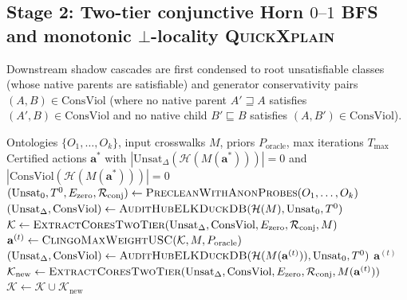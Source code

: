 \documentclass[10pt]{article}
\theoremstyle{accentdef}
\begin{document}
\subsection*{Stage 2: Two-tier conjunctive Horn $0\text{--}1$ BFS and monotonic $\bot$-locality \textsc{QuickXplain}}

Downstream shadow cascades are first condensed to root unsatisfiable classes (whose native parents are satisfiable) and generator conservativity pairs $(A, B) \in \mathrm{ConsViol}$ (where no native parent $A' \sqsupseteq A$ satisfies $(A', B) \in \mathrm{ConsViol}$ and no native child $B' \sqsubseteq B$ satisfies $(A, B') \in \mathrm{ConsViol}$).

\begin{algorithm}[t]
\caption{Two-Tier Exact Conflict Core Extraction and Max-Weight Lattice CEGAR}
\label{alg:cegar}
\footnotesize
\begin{algorithmic}[1]
\Require Ontologies $\{O_1,\dots,O_k\}$, input crosswalks $M$, priors $P_{\mathrm{oracle}}$, max iterations $T_{\max}$
\Ensure Certified actions $\mathbf{a}^*$ with $|\mathrm{Unsat}_{\Delta}(\mathcal{H}(M(\mathbf{a}^*)))| = 0$ and $|\mathrm{ConsViol}(\mathcal{H}(M(\mathbf{a}^*)))| = 0$
\State $(\mathrm{Unsat}_0, T^0, E_{\mathrm{zero}}, \mathcal{R}_{\mathrm{conj}}) \gets \textsc{PrecleanWithAnonProbes}(O_1,\dots,O_k)$ 
\State $(\mathrm{Unsat}_{\Delta}, \mathrm{ConsViol}) \gets \textsc{AuditHubELKDuckDB}(\mathcal{H}(M), \mathrm{Unsat}_0, T^0)$
\State $\mathcal{K} \gets \textsc{ExtractCoresTwoTier}(\mathrm{Unsat}_{\Delta}, \mathrm{ConsViol}, E_{\mathrm{zero}}, \mathcal{R}_{\mathrm{conj}}, M)$
  \State $\mathbf{a}^{(t)} \gets \textsc{ClingoMaxWeightUSC}(\mathcal{K}, M, P_{\mathrm{oracle}})$ 
  \State $(\mathrm{Unsat}_{\Delta}, \mathrm{ConsViol}) \gets \textsc{AuditHubELKDuckDB}(\mathcal{H}(M(\mathbf{a}^{(t)})), \mathrm{Unsat}_0, T^0)$
    \State \Return $\mathbf{a}^{(t)}$ 
  \EndIf
  \State $\mathcal{K}_{\mathrm{new}} \gets \textsc{ExtractCoresTwoTier}(\mathrm{Unsat}_{\Delta}, \mathrm{ConsViol}, E_{\mathrm{zero}}, \mathcal{R}_{\mathrm{conj}}, M(\mathbf{a}^{(t)}))$
  \State $\mathcal{K} \gets \mathcal{K} \cup \mathcal{K}_{\mathrm{new}}$
\EndFor
\end{algorithmic}
\end{algorithm}
\end{document}
